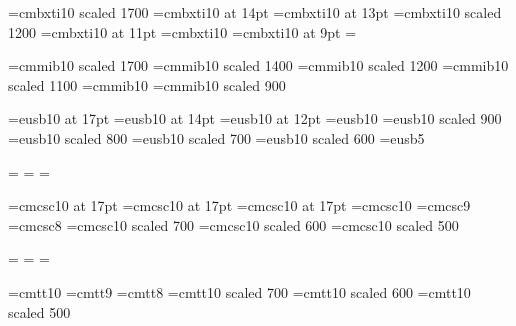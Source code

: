 \def\bb{\fam\bbfam\tenbb}

% 

\font\seventeenti=cmbxti10 scaled 1700
\font\fourteenti=cmbxti10 at 14pt
\font\thirteenti=cmbxti10 at 13pt
\font\twelveti=cmbxti10 scaled 1200
\font\eleventi=cmbxti10 at 11pt
\font\tenti=cmbxti10
\font\nineti=cmbxti10 at 9pt
\newfam\bolditfam
\textfont\bolditfam=\tenti
\def\boldit{\fam\bolditfam\tenti}

% 

\font\seventeenib=cmmib10 scaled 1700
\font\fourteenib=cmmib10 scaled 1400
\font\twelveib=cmmib10 scaled 1200
\font\elevenib=cmmib10 scaled 1100
\font\tenib=cmmib10
\font\nineib=cmmib10 scaled 900


\font\seventeenscalb=eusb10  at 17pt 
\font\fourteenscalb=eusb10 at 14pt
\font\twelvescalb=eusb10 at 12pt
\font\tenscalb=eusb10      
\font\ninescalb=eusb10 scaled 900
\font\eightscalb=eusb10 scaled 800
\font\sevenscalb=eusb10 scaled 700
\font\sixscalb=eusb10 scaled 600
\font\fivescalb=eusb5

\newfam\scalbfam
\textfont\scalbfam=\tenscalb
\scriptfont\scalbfam=\sevenscalb
\scriptscriptfont\scalbfam=\fivescalb

\def\scalb{\fam\scalbfam\tenscalb}




\font\seventeenpcap=cmcsc10 at 17pt
\font\fourteenpcap=cmcsc10 at 17pt
\font\twelvepcap=cmcsc10 at 17pt
\font\tenpcap=cmcsc10
\font\ninepcap=cmcsc9
\font\eightpcap=cmcsc8
\font\sevenpcap=cmcsc10 scaled 700
\font\sixpcap=cmcsc10 scaled 600
\font\fivepcap=cmcsc10 scaled 500

\newfam\pcapfam
\textfont\pcapfam=\tenpcap
\scriptfont\pcapfam=\sevenpcap
\scriptscriptfont\pcapfam=\fivepcap

\def\pcap{\fam\pcapfam\tenpcap}

% 

\font\tentt=cmtt10
\font\ninett=cmtt9                 
\font\eighttt=cmtt8
\font\seventt=cmtt10 scaled 700
\font\sixtt=cmtt10 scaled 600
\font\fivett=cmtt10 scaled 500

